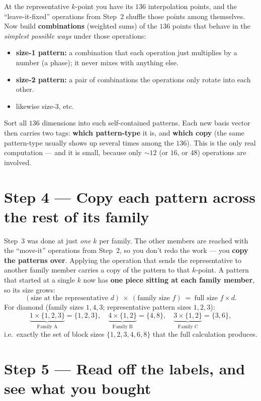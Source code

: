 \documentclass[11pt]{article}
\begin{document}
At the representative $k$-point you have its $136$ interpolation points, and the ``leave-it-fixed''
operations from Step~2 shuffle those points among themselves. Now build \textbf{combinations}
(weighted sums) of the $136$ points that behave in the \emph{simplest possible ways} under those
operations:
\begin{itemize}[nosep]
  \item \textbf{size-1 pattern:} a combination that each operation just multiplies by a number (a
        phase); it never mixes with anything else.
  \item \textbf{size-2 pattern:} a pair of combinations the operations only rotate into each other.
  \item likewise size-3, etc.
\end{itemize}
Sort all $136$ dimensions into such self-contained patterns. Each new basis vector then carries two
tags: \textbf{which pattern-type} it is, and \textbf{which copy} (the same pattern-type usually shows
up several times among the $136$). This is the only real computation --- and it is small, because
only $\sim\!12$ (or $16$, or $48$) operations are involved.

\section*{Step 4 --- Copy each pattern across the rest of its family}

Step~3 was done at just \emph{one} $k$ per family. The other members are reached with the ``move-it''
operations from Step~2, so you don't redo the work --- you \textbf{copy the patterns over}. Applying
the operation that sends the representative to another family member carries a copy of the pattern to
that $k$-point. A pattern that started at a single $k$ now has \textbf{one piece sitting at each
family member}, so its size grows:
\[
   (\text{size at the representative } d)\ \times\ (\text{family size } f)\ =\ \text{full size } f\times d .
\]
For diamond (family sizes $1,4,3$; representative pattern sizes $1,2,3$):
\[
  \underbrace{1\times\{1,2,3\}}_{\text{Family A}}=\{1,2,3\},\quad
  \underbrace{4\times\{1,2\}}_{\text{Family B}}=\{4,8\},\quad
  \underbrace{3\times\{1,2\}}_{\text{Family C}}=\{3,6\},
\]
i.e.\ exactly the set of block sizes $\{1,2,3,4,6,8\}$ that the full calculation produces.

\section*{Step 5 --- Read off the labels, and see what you bought}
\end{document}
